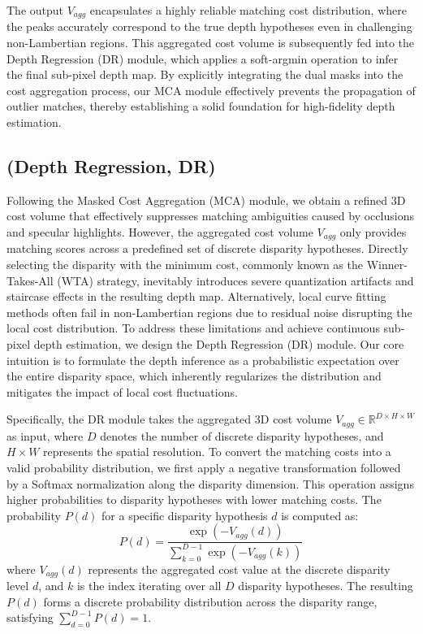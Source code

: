 The output $V_{agg}$ encapsulates a highly reliable matching cost distribution, where the peaks accurately correspond to the true depth hypotheses even in challenging non-Lambertian regions. This aggregated cost volume is subsequently fed into the Depth Regression (DR) module, which applies a soft-argmin operation to infer the final sub-pixel depth map. By explicitly integrating the dual masks into the cost aggregation process, our MCA module effectively prevents the propagation of outlier matches, thereby establishing a solid foundation for high-fidelity depth estimation.

\subsection{(Depth Regression, DR)}

Following the Masked Cost Aggregation (MCA) module, we obtain a refined 3D cost volume that effectively suppresses matching ambiguities caused by occlusions and specular highlights. However, the aggregated cost volume $V_{agg}$ only provides matching scores across a predefined set of discrete disparity hypotheses. Directly selecting the disparity with the minimum cost, commonly known as the Winner-Takes-All (WTA) strategy, inevitably introduces severe quantization artifacts and staircase effects in the resulting depth map. Alternatively, local curve fitting methods often fail in non-Lambertian regions due to residual noise disrupting the local cost distribution. To address these limitations and achieve continuous sub-pixel depth estimation, we design the Depth Regression (DR) module. Our core intuition is to formulate the depth inference as a probabilistic expectation over the entire disparity space, which inherently regularizes the distribution and mitigates the impact of local cost fluctuations.

Specifically, the DR module takes the aggregated 3D cost volume $V_{agg} \in \mathbb{R}^{D \times H \times W}$ as input, where $D$ denotes the number of discrete disparity hypotheses, and $H \times W$ represents the spatial resolution. To convert the matching costs into a valid probability distribution, we first apply a negative transformation followed by a Softmax normalization along the disparity dimension. This operation assigns higher probabilities to disparity hypotheses with lower matching costs. The probability $P(d)$ for a specific disparity hypothesis $d$ is computed as:
\begin{equation}
\label{eq:eq41}
P(d) = \frac{\exp(-V_{agg}(d))}{\sum_{k=0}^{D-1} \exp(-V_{agg}(k))}
\end{equation}
where $V_{agg}(d)$ represents the aggregated cost value at the discrete disparity level $d$, and $k$ is the index iterating over all $D$ disparity hypotheses. The resulting $P(d)$ forms a discrete probability distribution across the disparity range, satisfying $\sum_{d=0}^{D-1} P(d) = 1$.


